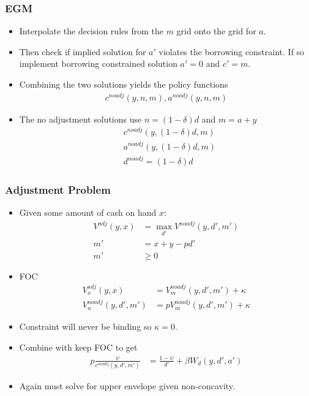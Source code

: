 \documentclass[english,xcolor=svgnames]{beamer}
\begin{document}
\begin{frame}
    \frametitle{EGM}
    \begin{itemize}
        \item Interpolate the decision rules from the $m$ grid onto the grid for $a$.
        \item Then check if implied solution for $a'$ violates the borrowing constraint. If so implement borrowing constrained solution $a'=0$ and $c' = m$.
        \item Combining the two solutions yields the policy functions
        \begin{align*}
            c^{noadj}(y,n,m), a^{noadj}(y,n,m)
        \end{align*}
        \item The no adjustment solutions use $n=(1-\delta)d$ and $m=a +y$
        \begin{align*}
            &c^{noadj}(y,(1-\delta)d,m) \\
            &a^{noadj}(y,(1-\delta)d,m) \\
            &d^{noadj}=(1-\delta)d
        \end{align*}
    \end{itemize}
\end{frame}



\begin{frame}
    \frametitle{Adjustment Problem}
    \begin{itemize}
        \item Given some amount of cash on hand $x$:
        \begin{align*}
            V^{adj}(y,x) &= \max_{d'} V^{noadj}(y,d',m') \\
            m' &= x+y-pd'  \\
            m' &\ge 0
        \end{align*}
        \item FOC
        \begin{align*}
            V_x^{adj}(y,x) &= V_m^{noadj}(y,d',m') + \kappa \\
            V_n^{noadj}(y,d',m') &= p V_m^{noadj}(y,d',m') + \kappa
        \end{align*}
        \item Constraint will never be binding so $\kappa=0$. 
        \item Combine with keep FOC to get
        \begin{align*}
            p\frac{\psi}{c^{noadj}(y,d',m')} &=   \frac{1-\psi}{d'}  + \beta W_d(y,d',a') 
        \end{align*}
        \item Again must solve for upper envelope given non-concavity.
    \end{itemize}
\end{frame}
\end{document}
